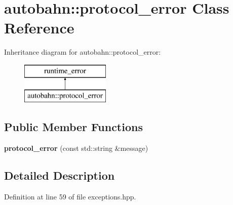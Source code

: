 \hypertarget{classautobahn_1_1protocol__error}{}\section{autobahn\+:\+:protocol\+\_\+error Class Reference}
\label{classautobahn_1_1protocol__error}
Inheritance diagram for autobahn\+:\+:protocol\+\_\+error\+:\begin{figure}[H]
\begin{center}
\leavevmode
\includegraphics[height=2.000000cm]{classautobahn_1_1protocol__error}
\end{center}
\end{figure}
\subsection*{Public Member Functions}
\begin{DoxyCompactItemize}
\item 
{\bfseries protocol\+\_\+error} (const std\+::string \&message)\hypertarget{classautobahn_1_1protocol__error_aa8c6e9c1631c24733036b4dee887c961}{}\label{classautobahn_1_1protocol__error_aa8c6e9c1631c24733036b4dee887c961}

\end{DoxyCompactItemize}


\subsection{Detailed Description}


Definition at line 59 of file exceptions.\+hpp.

